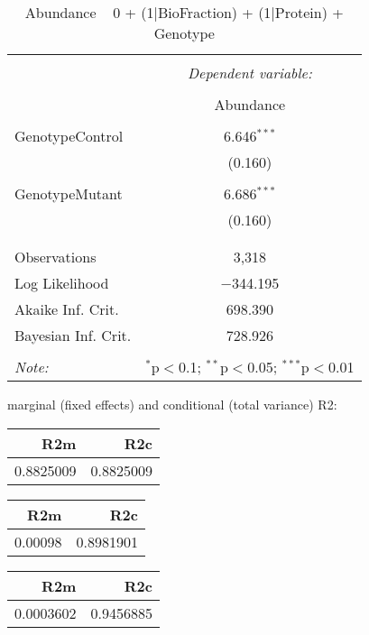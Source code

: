 \documentclass[11pt]{report}
\begin{document}
\begin{table}[!htbp] \centering 
  \caption{Abundance ~ 0 + (1|BioFraction) + (1|Protein) + Genotype} 
  \label{} 
\begin{tabular}{@{\extracolsep{5pt}}lc} 
\\[-1.8ex]\hline 
\hline \\[-1.8ex] 
 & \multicolumn{1}{c}{\textit{Dependent variable:}} \\ 
\cline{2-2} 
\\[-1.8ex] & Abundance \\ 
\hline \\[-1.8ex] 
 GenotypeControl & 6.646$^{***}$ \\ 
  & (0.160) \\ 
  & \\ 
 GenotypeMutant & 6.686$^{***}$ \\ 
  & (0.160) \\ 
  & \\ 
\hline \\[-1.8ex] 
Observations & 3,318 \\ 
Log Likelihood & $-$344.195 \\ 
Akaike Inf. Crit. & 698.390 \\ 
Bayesian Inf. Crit. & 728.926 \\ 
\hline 
\hline \\[-1.8ex] 
\textit{Note:}  & \multicolumn{1}{r}{$^{*}$p$<$0.1; $^{**}$p$<$0.05; $^{***}$p$<$0.01} \\ 
\end{tabular} 
\end{table} 
marginal (fixed effects) and conditional (total variance) R2:

\begin{tabular}{r|r}
\hline
R2m & R2c\\
\hline
0.8825009 & 0.8825009\\
\hline
\end{tabular}

\begin{tabular}{r|r}
\hline
R2m & R2c\\
\hline
0.00098 & 0.8981901\\
\hline
\end{tabular}

\begin{tabular}{r|r}
\hline
R2m & R2c\\
\hline
0.0003602 & 0.9456885\\
\hline
\end{tabular}
\end{document}
